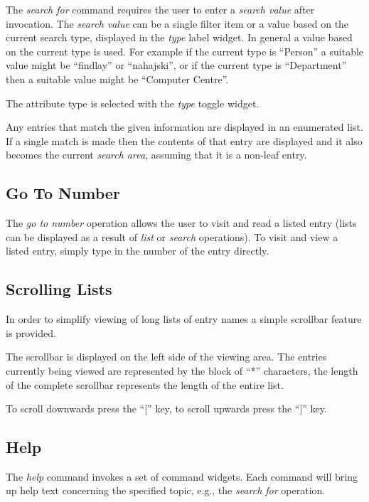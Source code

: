 The {\em search for} command requires the user to enter a {\em search value}
after invocation.
The {\em search value} can be a single filter item or a value based on the 
current search type, 
displayed in the {\em type} label widget.
In general a value based on the current type is used.
For example if the current type is ``Person'' a suitable value might be
``findlay'' or ``nahajski'',
or if the current type is ``Department'' then a suitable value might be
``Computer Centre''.

The attribute type is selected with the {\em type} toggle widget.

Any entries that match the given information are displayed in an enumerated
list.
If a single match is made then the contents of that entry are displayed
and it also becomes the current {\em search area},
assuming that it is a non-leaf entry.

\subsection {Go To Number}

The {\em go to number} operation allows the user to visit and read a listed
entry (lists can be displayed as a result of {\em list} or {\em search}
operations).
To visit and view a listed entry,
simply type in the number of the entry directly.

\subsection {Scrolling Lists}

In order to simplify viewing of long lists of entry names a simple scrollbar
feature is provided.

The scrollbar is displayed on the left side of the viewing area.
The entries currently being viewed are represented by the block of ``*''
characters, 
the length of the complete scrollbar represents the length of the entire
list.

To scroll downwards press the ``['' key,
to scroll upwards press the ``]'' key.

\subsection {Help}

The {\em help} command invokes a set of command widgets.
Each command will bring up help text concerning the specified topic,
e.g., the {\em search for} operation.

